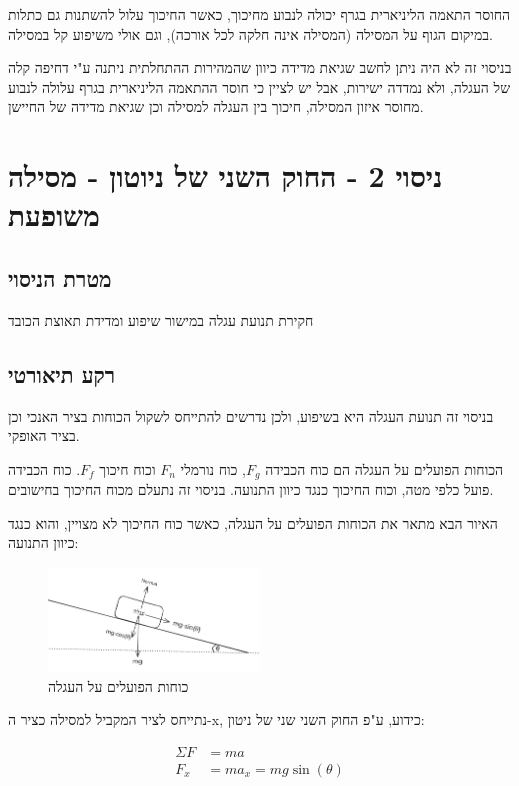 \documentclass[14pt]{extarticle}
\begin{document}
החוסר התאמה הליניארית בגרף יכולה לנבוע מחיכוך, כאשר החיכוך עלול להשתנות גם כתלות במיקום הגוף על המסילה (המסילה אינה חלקה לכל אורכה), וגם אולי משיפוע קל במסילה.

בניסוי זה לא היה ניתן לחשב שגיאת מדידה כיוון שהמהירות ההתחלתית ניתנה ע"י דחיפה קלה של העגלה, ולא נמדדה ישירות,  אבל יש לציין כי חוסר ההתאמה הליניארית בגרף עלולה לנבוע מחוסר איזון המסילה, חיכוך בין העגלה למסילה וכן שגיאת מדידה של החיישן.

\section*{ניסוי 2 - החוק השני של ניוטון - מסילה משופעת}
\subsection*{מטרת הניסוי}
חקירת תנועת עגלה במישור שיפוע ומדידת תאוצת הכובד

\subsection*{רקע תיאורטי}
בניסוי זה תנועת העגלה היא בשיפוע, ולכן נדרשים להתייחס לשקול הכוחות בציר האנכי וכן בציר האופקי.

הכוחות הפועלים על העגלה הם כוח הכבידה $F_g$, כוח נורמלי $F_n$ וכוח חיכוך $F_f$.
כוח הכבידה פועל כלפי מטה, וכוח החיכוך כנגד כיוון התנועה. בניסוי זה נתעלם מכוח החיכוך בחישובים.

האיור הבא מתאר את הכוחות הפועלים על העגלה, כאשר כוח החיכוך לא מצויין, והוא כנגד כיוון התנועה:
\begin{figure}[H]
    \centering
    \includegraphics[width=0.5\textwidth]{maman_13_experiment_2_forces_chart.png}
    \caption{כוחות הפועלים על העגלה}
\end{figure}

נתייחס לציר המקביל למסילה כציר ה-x, כידוע, ע"פ החוק השני שני של ניטון:
\begin{center}
\begin{equation}
\begin{aligned}
\Sigma F & = m a \\
F_x & = m a_x = mg \sin(\theta)
\end{aligned}
\end{equation}
\end{center}
\end{document}
